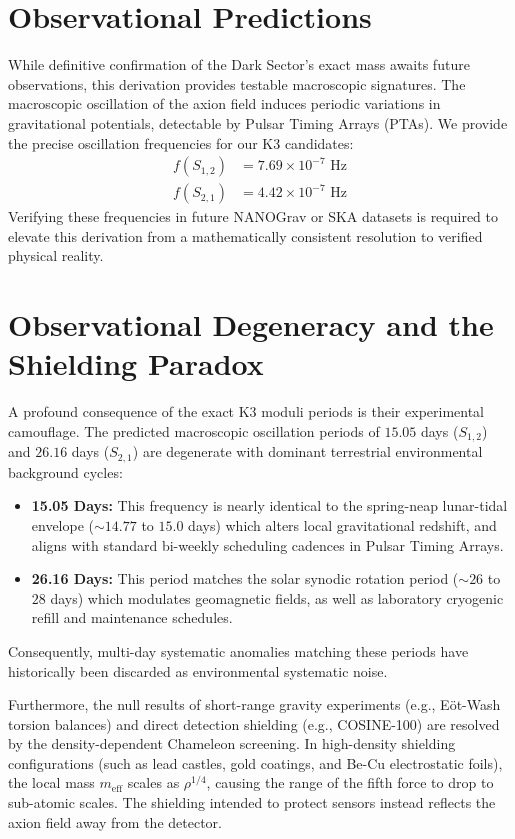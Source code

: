 \documentclass[11pt,a4paper]{article}
\begin{document}
\section{Observational Predictions}
While definitive confirmation of the Dark Sector's exact mass awaits future observations, this derivation provides testable macroscopic signatures. The macroscopic oscillation of the axion field induces periodic variations in gravitational potentials, detectable by Pulsar Timing Arrays (PTAs). We provide the precise oscillation frequencies for our K3 candidates:
\begin{align}
f(S_{1,2}) &= 7.69 \times 10^{-7} \text{ Hz} \\
f(S_{2,1}) &= 4.42 \times 10^{-7} \text{ Hz}
\end{align}
Verifying these frequencies in future NANOGrav or SKA datasets is required to elevate this derivation from a mathematically consistent resolution to verified physical reality.

\section{Observational Degeneracy and the Shielding Paradox}
A profound consequence of the exact K3 moduli periods is their experimental camouflage. The predicted macroscopic oscillation periods of $15.05$ days ($S_{1,2}$) and $26.16$ days ($S_{2,1}$) are degenerate with dominant terrestrial environmental background cycles:
\begin{itemize}
    \item \textbf{15.05 Days:} This frequency is nearly identical to the spring-neap lunar-tidal envelope ($\sim 14.77$ to $15.0$ days) which alters local gravitational redshift, and aligns with standard bi-weekly scheduling cadences in Pulsar Timing Arrays.
    \item \textbf{26.16 Days:} This period matches the solar synodic rotation period ($\sim 26$ to $28$ days) which modulates geomagnetic fields, as well as laboratory cryogenic refill and maintenance schedules.
\end{itemize}
Consequently, multi-day systematic anomalies matching these periods have historically been discarded as environmental systematic noise.

Furthermore, the null results of short-range gravity experiments (e.g., E\"ot-Wash torsion balances) and direct detection shielding (e.g., COSINE-100) are resolved by the density-dependent Chameleon screening. In high-density shielding configurations (such as lead castles, gold coatings, and Be-Cu electrostatic foils), the local mass $m_{\text{eff}}$ scales as $\rho^{1/4}$, causing the range of the fifth force to drop to sub-atomic scales. The shielding intended to protect sensors instead reflects the axion field away from the detector.
\end{document}
